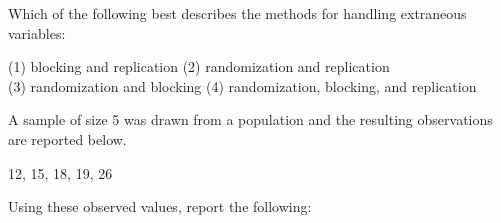 \documentclass[addpoints]{examsetup}
\begin{document}



\examCoverPage

\begin{questions}


\question[2] 
 Which of the following best describes the methods for handling extraneous variables:

(1) blocking and replication \hspace{1cm}(2) randomization and
replication \\ (3) randomization and blocking \hspace{0.5cm}(4)
randomization, blocking, and replication

% 

\vspace{1cm}

\question 


A sample of size 5 was drawn from a population and the resulting observations are reported below. 
\begin{center}
12, 15, 18, 19, 26
\end{center}
Using these observed values, report the following:
\vspace{1cm}

\end{questions}
\end{document}
